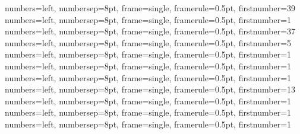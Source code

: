 {numbers=left, numbersep=8pt, frame=single, framerule=0.5pt, firstnumber=39}
{numbers=left, numbersep=8pt, frame=single, framerule=0.5pt, firstnumber=1}
{numbers=left, numbersep=8pt, frame=single, framerule=0.5pt, firstnumber=37}
{numbers=left, numbersep=8pt, frame=single, framerule=0.5pt, firstnumber=5}
{numbers=left, numbersep=8pt, frame=single, framerule=0.5pt, firstnumber=1}
{numbers=left, numbersep=8pt, frame=single, framerule=0.5pt, firstnumber=1}
{numbers=left, numbersep=8pt, frame=single, framerule=0.5pt, firstnumber=1}
{numbers=left, numbersep=8pt, frame=single, framerule=0.5pt, firstnumber=13}
{numbers=left, numbersep=8pt, frame=single, framerule=0.5pt, firstnumber=1}
{numbers=left, numbersep=8pt, frame=single, framerule=0.5pt, firstnumber=1}
{numbers=left, numbersep=8pt, frame=single, framerule=0.5pt, firstnumber=1}